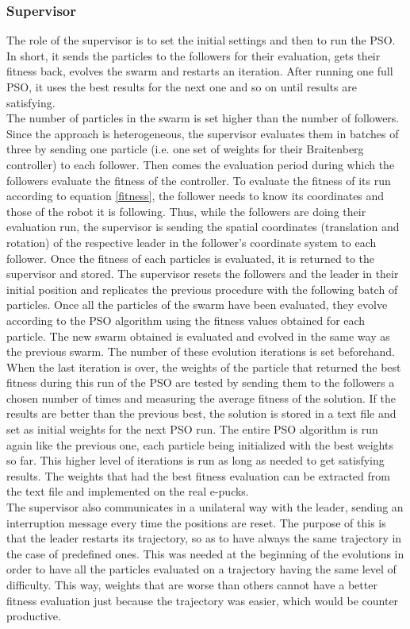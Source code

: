 \documentclass[a4paper, 10pt, conference]{ieeeconf}      %
\begin{document}
\subsubsection{Supervisor}
The role of the supervisor is to set the initial settings and then to run the PSO. In short, it sends the particles to the followers for their evaluation, gets their fitness back, evolves the swarm and restarts an iteration. After running one full PSO, it uses the best results for the next one and so on until results are satisfying.\\
The number of particles in the swarm is set higher than the number of followers. Since the approach is heterogeneous, the supervisor evaluates them in batches of three by sending one particle (i.e. one set of weights for their Braitenberg controller) to each follower. Then comes the evaluation period during which the followers evaluate the fitness of the controller. To evaluate the fitness of its run according to equation \ref{fitness}, the follower needs to know its coordinates and those of the robot it is following. Thus, while the followers are doing their evaluation run, the supervisor is sending the spatial coordinates (translation and rotation) of the respective leader in the follower's coordinate system to each follower. Once the fitness of each particles is evaluated, it is returned to the supervisor and stored. The supervisor resets the followers and the leader in their initial position and replicates the previous procedure with the following batch of particles. Once all the particles of the swarm have been evaluated, they evolve according to the PSO algorithm using the fitness values obtained for each particle. The new swarm obtained is evaluated  and evolved in the same way as the previous swarm. The number of these evolution iterations is set beforehand.\\
When the last iteration is over, the weights of the particle that returned the best fitness during this run of the PSO are tested by sending them to the followers a chosen number of times and measuring the average fitness of the solution. If the results are better than the previous best, the solution is stored in a text file and set as initial weights for the next PSO run. The entire PSO algorithm is run again like the previous one, each particle being initialized with the best weights so far. This higher level of iterations is run as long as needed to get satisfying results. The weights that had the best fitness evaluation can be extracted from the text file and implemented on the real e-pucks.\\
The supervisor also communicates in a unilateral way with the leader, sending an interruption message every time the positions are reset. The purpose of this is that the leader restarts its trajectory, so as to have always the same trajectory in the case of predefined ones. This was needed at the beginning of the evolutions in order to have all the particles evaluated on a trajectory having the same level of difficulty. This way, weights that are worse than others cannot have a better fitness evaluation just because the trajectory was easier, which would be counter productive.
\end{document}
